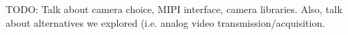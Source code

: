 TODO: Talk about camera choice, MIPI interface, camera libraries. Also, talk about alternatives we explored (i.e. analog video transmission/acquisition.
